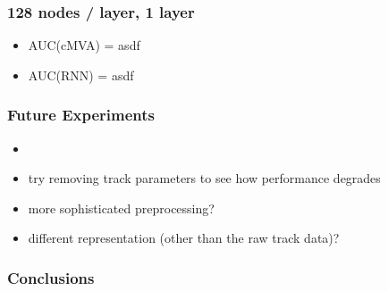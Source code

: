 \documentclass{beamer}
\begin{document}
\begin{frame}
  \frametitle{128 nodes / layer, 1 layer}

  \begin{itemize}
  \item AUC(cMVA) = asdf
  \item AUC(RNN) = asdf
  \end{itemize}
\end{frame}

\begin{frame}
  \frametitle{Future Experiments}

  \begin{itemize}
    \item 
    \item try removing track parameters to see how performance degrades
    \item more sophisticated preprocessing?
    \item different representation (other than the raw track data)?
  \end{itemize}
\end{frame}

\begin{frame}
  \frametitle{Conclusions}
\end{frame}
 
\end{document}

